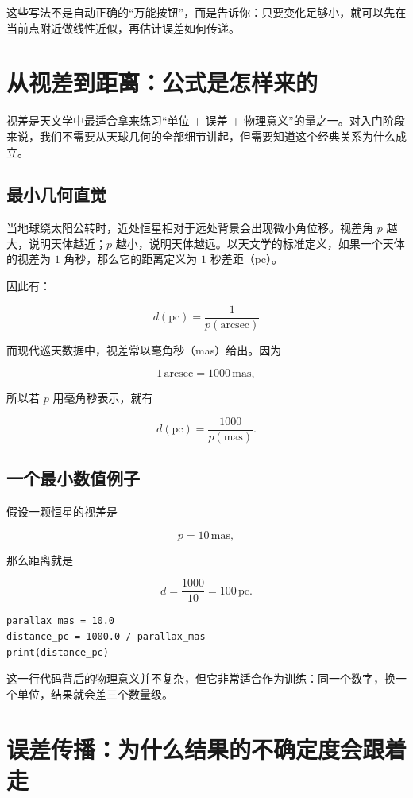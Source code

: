 这些写法不是自动正确的“万能按钮”，而是告诉你：只要变化足够小，就可以先在当前点附近做线性近似，再估计误差如何传递。

\section{从视差到距离：公式是怎样来的}

视差是天文学中最适合拿来练习“单位 + 误差 + 物理意义”的量之一。对入门阶段来说，我们不需要从天球几何的全部细节讲起，但需要知道这个经典关系为什么成立。

\subsection{最小几何直觉}

当地球绕太阳公转时，近处恒星相对于远处背景会出现微小角位移。视差角 $p$ 越大，说明天体越近；$p$ 越小，说明天体越远。以天文学的标准定义，如果一个天体的视差为 $1$ 角秒，那么它的距离定义为 $1$ 秒差距（pc）。

因此有：

\[
d(\mathrm{pc}) = \frac{1}{p(\mathrm{arcsec})}
\]

而现代巡天数据中，视差常以毫角秒（mas）给出。因为

\[
1\,\mathrm{arcsec} = 1000\,\mathrm{mas},
\]

所以若 $p$ 用毫角秒表示，就有

\[
d(\mathrm{pc}) = \frac{1000}{p(\mathrm{mas})}.
\]

\subsection{一个最小数值例子}

假设一颗恒星的视差是

\[
p = 10\,\mathrm{mas},
\]

那么距离就是

\[
d = \frac{1000}{10} = 100\,\mathrm{pc}.
\]

\begin{examplebox}[从视差估计距离]
\begin{lstlisting}[style=pythonstyle]
parallax_mas = 10.0
distance_pc = 1000.0 / parallax_mas
print(distance_pc)
\end{lstlisting}
\end{examplebox}

这一行代码背后的物理意义并不复杂，但它非常适合作为训练：同一个数字，换一个单位，结果就会差三个数量级。

\section{误差传播：为什么结果的不确定度会跟着走}

